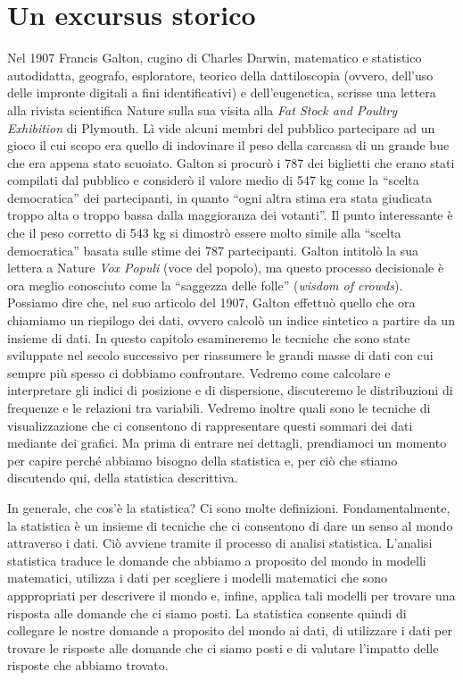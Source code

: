 \documentclass[
  11pt,
  italian,
  a4paper,
  extrafontsizes,onecolumn,openright
  ]{memoir}
\theoremstyle{definition}
\theoremstyle{definition}
\theoremstyle{definition}
\theoremstyle{definition}
\theoremstyle{remark}
\begin{document}
\hypertarget{un-excursus-storico}{%
\section{Un excursus storico}\label{un-excursus-storico}}

Nel 1907 Francis Galton, cugino di Charles Darwin, matematico e
statistico autodidatta, geografo, esploratore, teorico della
dattiloscopia (ovvero, dell'uso delle impronte digitali a fini
identificativi) e dell'eugenetica, scrisse una lettera alla rivista
scientifica Nature sulla sua visita alla \emph{Fat Stock and Poultry
Exhibition} di Plymouth. Lì vide alcuni membri del pubblico partecipare
ad un gioco il cui scopo era quello di indovinare il peso della carcassa
di un grande bue che era appena stato scuoiato. Galton si procurò i 787
dei biglietti che erano stati compilati dal pubblico e considerò il
valore medio di 547 kg come la ``scelta democratica'' dei partecipanti, in
quanto ``ogni altra stima era stata giudicata troppo alta o troppo bassa
dalla maggioranza dei votanti''. Il punto interessante è che il peso
corretto di 543 kg si dimostrò essere molto simile alla ``scelta
democratica'' basata sulle stime dei 787 partecipanti. Galton intitolò la
sua lettera a Nature \emph{Vox Populi} (voce del popolo), ma questo processo
decisionale è ora meglio conosciuto come la ``saggezza delle folle''
(\emph{wisdom of crowds}). Possiamo dire che, nel suo articolo del 1907,
Galton effettuò quello che ora chiamiamo un riepilogo dei dati, ovvero
calcolò un indice sintetico a partire da un insieme di dati. In questo
capitolo esamineremo le tecniche che sono state sviluppate nel secolo
successivo per riassumere le grandi masse di dati con cui sempre più
spesso ci dobbiamo confrontare. Vedremo come calcolare e interpretare
gli indici di posizione e di dispersione, discuteremo le distribuzioni
di frequenze e le relazioni tra variabili. Vedremo inoltre quali sono le
tecniche di visualizzazione che ci consentono di rappresentare questi
sommari dei dati mediante dei grafici. Ma prima di entrare nei dettagli, prendiamoci un momento per capire perché abbiamo bisogno della statistica e, per ciò che stiamo discutendo qui, della statistica descrittiva.

In generale, che cos'è la statistica? Ci sono molte definizioni. Fondamentalmente, la statistica è un insieme di tecniche che ci consentono di dare un senso al mondo attraverso i dati. Ciò avviene tramite il processo di analisi statistica. L'analisi statistica traduce le domande che abbiamo a proposito del mondo in modelli matematici, utilizza i dati per scegliere i modelli matematici che sono apppropriati per descrivere il mondo e, infine, applica tali modelli per trovare una risposta alle domande che ci siamo posti. La statistica consente quindi di collegare le nostre domande a proposito del mondo ai dati, di utilizzare i dati per trovare le risposte alle domande che ci siamo posti e di valutare l'impatto delle risposte che abbiamo trovato.
\end{document}
